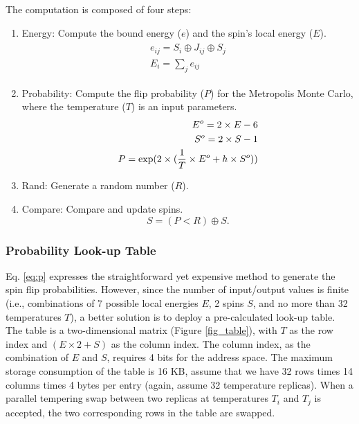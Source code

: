 The computation is composed of four steps:
\begin{enumerate}
\item Energy:
Compute the bound energy ($e$) and the spin's local energy ($E$).
\begin{align}
\label{eq:e}
\begin{split}
e_{ij} = S_i \oplus J_{ij} \oplus S_j\\
E_{i} = \sum_{j} e_{ij}
\end{split}
\end{align}

\item Probability:
Compute the flip probability ($P$) for the Metropolis Monte Carlo,
where the temperature ($T$) is an input parameters.
\begin{align}
\begin{split}
\label{eq:p}
E^o = 2 \times E - 6 \\
S^o = 2 \times S - 1 \\
P = \mathrm{exp} (2 \times (\frac{1}{T} \times E^o + h \times S^o))
\end{split}
\end{align}

\item Rand:
Generate a random number ($R$).

\item Compare:
Compare and update spins.
\begin{equation}
\label{eq:r}
S = (P < R) \oplus S.
\end{equation}
\end{enumerate}





\subsubsection{Probability Look-up Table}

\label{section_prob}

Eq. \ref{eq:p} expresses the straightforward yet expensive method to generate the spin flip 
probabilities. However, since the number of input/output values is finite (i.e., combinations of 7 
possible local energies $E$, 2 spins $S$, and no more than 32 temperatures $T$), a better solution 
is to deploy a pre-calculated look-up table. The table is a two-dimensional matrix (Figure \ref{fig_table}), 
with $T$ as the row index and $(E \times 2 + S)$ as the column index.  The column index, as the 
combination of $E$ and $S$, requires 4 bits for the address space. The maximum storage consumption 
of the table is 16 KB, assume that we have 32 rows times 14 columns times 4 bytes per entry (again, 
assume 32 temperature replicas).  When a parallel tempering swap between two replicas at temperatures 
$T_{i}$ and $T_{j}$ is accepted, the two corresponding rows in the table are swapped. 




